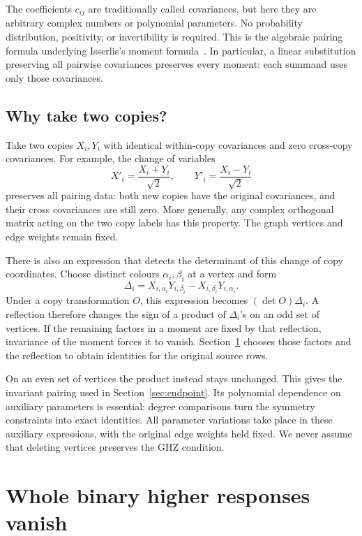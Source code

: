 \documentclass[11pt]{article}
\theoremstyle{definition}
\theoremstyle{plain}
\numberwithin{equation}{section}
\begin{document}
The coefficients \(c_{ij}\) are traditionally called covariances, but here
they are arbitrary complex numbers or polynomial parameters. No probability
distribution, positivity, or invertibility is required. This is the algebraic
pairing formula underlying Isserlis's moment formula~\cite{isserlis}.
In particular, a linear substitution preserving all pairwise covariances
preserves every moment: each summand uses only those covariances.

\subsection{Why take two copies?}\label{sec:twocopies}

Take two copies \(X_i,Y_i\) with identical within-copy covariances and zero
cross-copy covariances. For example, the change of variables
\[
 X'_i=\frac{X_i+Y_i}{\sqrt2},\qquad
 Y'_i=\frac{X_i-Y_i}{\sqrt2}
\]
preserves all pairing data: both new copies have the original covariances,
and their cross covariances are still zero. More generally, any complex
orthogonal matrix acting on the two copy labels has this property.
The graph vertices and edge weights remain fixed.

There is also an expression that detects the determinant of this change of
copy coordinates. Choose distinct colours \(\alpha_i,\beta_i\) at a
vertex and form
\[
 \Delta_i=X_{i,\alpha_i}Y_{i,\beta_i}
             -X_{i,\beta_i}Y_{i,\alpha_i}.
\]
Under a copy transformation \(O\), this expression becomes
\((\det O)\Delta_i\). A reflection therefore changes the sign of a product
of \(\Delta_i\)'s on an odd set of vertices. If the remaining factors in
a moment are fixed by that reflection, invariance of the moment forces it
to vanish. Section~\ref{sec:higher} chooses those factors and the reflection
to obtain identities for the original source rows.

On an even set of vertices the product instead stays unchanged. This gives
the invariant pairing used in Section~\ref{sec:endpoint}. Its polynomial
dependence on auxiliary parameters is essential: degree comparisons turn
the symmetry constraints into exact identities. All parameter variations
take place in these auxiliary expressions, with the original edge weights
held fixed. We never assume that deleting vertices preserves the GHZ
condition.

\section{Whole binary higher responses vanish}\label{sec:higher}
\end{document}
